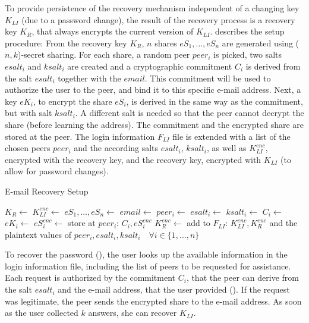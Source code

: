 To provide persistence of the recovery mechanism independent of a changing key $K_{LI}$ 
(\eg due to a password change), the result of the recovery process is a 
recovery key $K_R$, that always encrypts the current version of $K_{LI}$. 
 describes the setup procedure: 
From the recovery key $K_R$, $n$ shares $eS_1,\dots,eS_n$ are generated using ($n,k$)-secret
sharing. For each share, a random peer $peer_i$ is picked, two salts $esalt_i$ and $ksalt_i$ are created and a cryptographic commitment $C_i$
is derived from the salt $esalt_i$ together with the $email$. This commitment will be used to authorize the
user to the peer, and bind it to this specific e-mail address. 
Next, a key $eK_i$, to encrypt the share $eS_i$, is derived in the same way as the commitment, 
but with salt $ksalt_i$. 
A different salt is needed so that the peer cannot decrypt the share (before learning the address).
The commitment and the encrypted share are stored at the peer. The login information $F_{LI}$ file is extended
with a list of the chosen peers $peer_i$ and the according salts $esalt_i$, $ksalt_i$, as well as $K_{LI}^{enc}$,
encrypted with the recovery key, and the recovery key, encrypted with $K_{LI}$ (to allow for password changes).


\begin{algorithm}
\caption{E-mail Recovery Setup}
\begin{algorithmic}[\LineNumFrequency]
\State $K_R \gets$ \NewKey {}
\State $K_{LI}^{enc} \gets$ 
\State $eS_1,\dots,eS_n \gets$  
\State $email \gets$ 
  \State $peer_i \gets$ \GetPeer
  \State $esalt_i \gets$ \NewSalt
  \State $ksalt_i \gets$ \NewSalt
  \State $C_i \gets$  
  \State $eK_i \gets$ 
  \State $eS_i^{enc} \gets$  %
  \State store at $peer_i$: $C_i, eS_i^{enc}$  
\EndFor
\State $K_R^{enc} \gets$ 
\State add to $F_{LI}$: $K_{LI}^{enc}, K_R^{enc}$ and the plaintext values of $peer_i, esalt_i, ksalt_i \quad\forall i \in \{1,\dots,n\}$ 
\end{algorithmic}
\end{algorithm}


To recover the password (), the user looks up the available
information in the login information file, including the list of peers 
to be requested for assistance.
Each request is authorized by the commitment $C_i$, that the peer can derive
from the salt $esalt_i$ and the e-mail address, that the user provided ().
If the request was legitimate, the peer sends the encrypted share to the e-mail address.
As soon as the user collected $k$ answers, she can recover $K_{LI}$.

